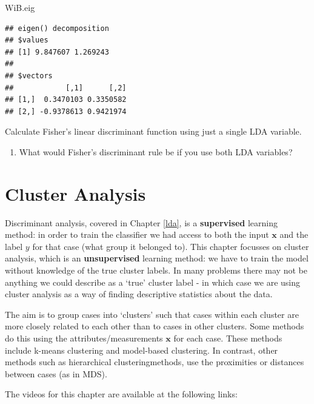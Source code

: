 \documentclass[
]{book}
\newenvironment{Shaded}{\begin{snugshade}}{\end{snugshade}}
\newcommand{\NormalTok}[1]{#1}
\providecommand{\tightlist}{%
  \setlength{\itemsep}{0pt}\setlength{\parskip}{0pt}}
\theoremstyle{definition}
\theoremstyle{definition}
\theoremstyle{definition}
\theoremstyle{definition}
\theoremstyle{remark}
\begin{document}
\begin{Shaded}
\begin{Highlighting}[]
\NormalTok{WiB.eig}
\end{Highlighting}
\end{Shaded}

\begin{verbatim}
## eigen() decomposition
## $values
## [1] 9.847607 1.269243
## 
## $vectors
##            [,1]      [,2]
## [1,]  0.3470103 0.3350582
## [2,] -0.9378613 0.9421974
\end{verbatim}

Calculate Fisher's linear discriminant function using just a single LDA variable.

\begin{enumerate}
\def\labelenumi{\roman{enumi}.}
\setcounter{enumi}{3}
\tightlist
\item
  What would Fisher's discriminant rule be if you use both LDA variables?
\end{enumerate}

\hypertarget{cluster}{%
\chapter{Cluster Analysis}\label{cluster}}

Discriminant analysis, covered in Chapter \ref{lda}, is a \textbf{supervised} learning method: in order to train the classifier we had access to both the input \(\mathbf x\) and the label \(y\) for that case (what group it belonged to).
This chapter focusses on cluster analysis, which is an \textbf{unsupervised} learning method: we have to train the model without knowledge of the true cluster labels. In many problems there may not be anything we could describe as a `true' cluster label - in which case we are using cluster analysis as a way of finding descriptive statistics about the data.

The aim is to group cases into `clusters' such that cases within each cluster are more closely related to each other than to cases in other clusters. Some methods do this using the attributes/measurements \(\mathbf x\) for each case. These methods include k-means clustering and model-based clustering. In contrast, other methods such as hierarchical clusteringmethods, use the proximities or distances between cases (as in MDS).

The videos for this chapter are available at the following links:
\end{document}
